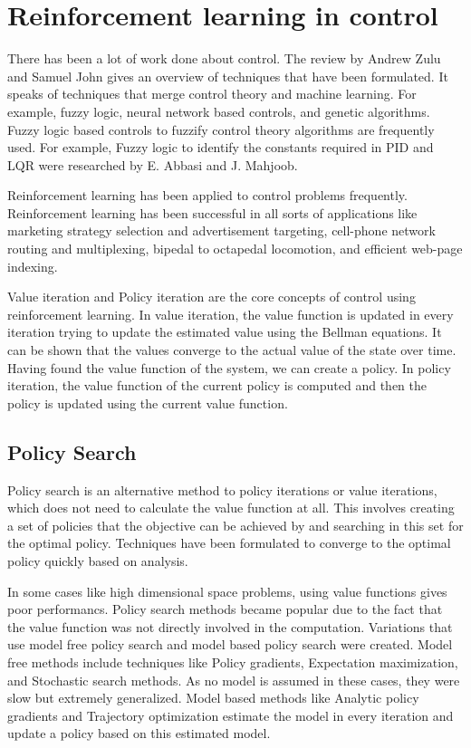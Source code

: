 \documentclass[hidelinks,BTech]{iitmdiss}
\begin{document}
\section{Reinforcement learning in control}

There has been a lot of work done about control. The review \cite{ControlForQuads} by Andrew Zulu and Samuel John gives an overview of techniques that have been formulated. It speaks of techniques that merge control theory and machine learning. For example, fuzzy logic, neural network based controls, and genetic algorithms. Fuzzy logic based controls to fuzzify control theory algorithms are frequently used. For example, Fuzzy logic to identify the constants required in PID and LQR were researched by E. Abbasi and J. Mahjoob.

Reinforcement learning has been applied to control problems frequently. Reinforcement learning has been successful in all sorts of applications like marketing strategy selection and advertisement targeting, cell-phone network routing and multiplexing, bipedal to octapedal locomotion, and efficient web-page indexing.

Value iteration and Policy iteration are the core concepts of control using reinforcement learning. In value iteration, the value function is updated in every iteration trying to update the estimated value using the Bellman equations. It can be shown that the values converge to the actual value of the state over time. Having found the value function of the system, we can create a policy. In policy iteration, the value function of the current policy is computed and then the policy is updated using the current value function.

\subsection*{Policy Search}
Policy search is an alternative method to policy iterations or value iterations, which does not need to calculate the value function at all. This involves creating a set of policies that the objective can be achieved by and searching in this set for the optimal policy. Techniques have been formulated to converge to the optimal policy quickly based on analysis.

In some cases like high dimensional space problems, using value functions gives poor performancs. Policy search methods became popular due to the fact that the value function was not directly involved in the computation. Variations that use model free policy search and model based policy search were created. Model free methods include techniques like Policy gradients, Expectation maximization, and Stochastic search methods. As no model is assumed in these cases, they were slow but extremely generalized. Model based methods like Analytic policy gradients and Trajectory optimization estimate the model in every iteration and update a policy based on this estimated model.
\end{document}
